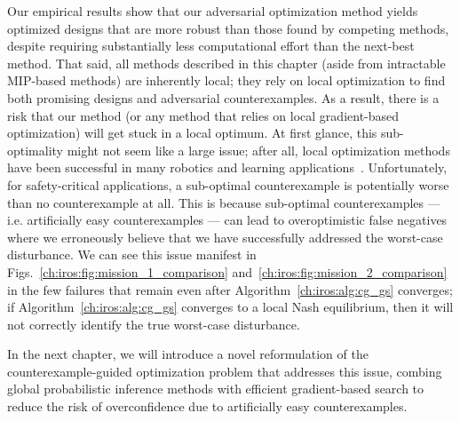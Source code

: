 Our empirical results show that our adversarial optimization method yields optimized designs that are more robust than those found by competing methods, despite requiring substantially less computational effort than the next-best method. That said, all methods described in this chapter (aside from intractable MIP-based methods) are inherently local; they rely on local optimization to find both promising designs and adversarial counterexamples. As a result, there is a risk that our method (or any method that relies on local gradient-based optimization) will get stuck in a local optimum. At first glance, this sub-optimality might not seem like a large issue; after all, local optimization methods have been successful in many robotics and learning applications~\cite{dawsonCertifiableRobotDesign2022}. Unfortunately, for safety-critical applications, a sub-optimal counterexample is potentially worse than no counterexample at all. This is because sub-optimal counterexamples --- i.e. artificially easy counterexamples --- can lead to overoptimistic false negatives where we erroneously believe that we have successfully addressed the worst-case disturbance. We can see this issue manifest in Figs.~\ref{ch:iros:fig:mission_1_comparison} and~\ref{ch:iros:fig:mission_2_comparison} in the few failures that remain even after Algorithm~\ref{ch:iros:alg:cg_gs} converges; if Algorithm~\ref{ch:iros:alg:cg_gs} converges to a local Nash equilibrium, then it will not correctly identify the true worst-case disturbance.

In the next chapter, we will introduce a novel reformulation of the counterexample-guided optimization problem that addresses this issue, combing global probabilistic inference methods with efficient gradient-based search to reduce the risk of overconfidence due to artificially easy counterexamples.